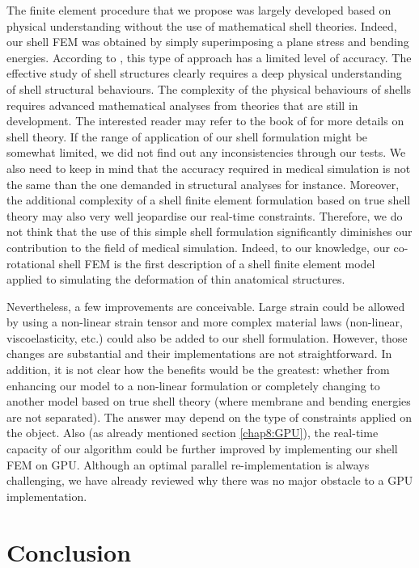 The finite element procedure that we propose was largely developed based on physical understanding without the use of mathematical shell theories. Indeed, our shell FEM was obtained by simply superimposing a plane stress and bending energies. According to \cite{Chapelle03}, this type of approach has a limited level of accuracy. The effective study of shell structures clearly requires a deep physical understanding of shell structural behaviours. The complexity of the physical behaviours of shells requires advanced mathematical analyses from theories that are still in development. The interested reader may refer to the book of \cite{Chapelle03} for more details on shell theory. If the range of application of our shell formulation might be somewhat limited, we did not find out any inconsistencies through our tests. We also need to keep in mind that the accuracy required in medical simulation is not the same than the one demanded in structural analyses for instance. Moreover, the additional complexity of a shell finite element formulation based on true shell theory may also very well jeopardise our real-time constraints. Therefore, we do not think that the use of this simple shell formulation significantly diminishes our contribution to the field of medical simulation. Indeed, to our knowledge, our co-rotational shell FEM is the first description of a shell finite element model applied to simulating the deformation of thin anatomical structures. 

Nevertheless, a few improvements are conceivable. Large strain could be allowed by using a non-linear strain tensor and more complex material laws (non-linear, viscoelasticity, etc.) could also be added to our shell formulation. However, those changes are substantial and their implementations are not straightforward. In addition, it is not clear how the benefits would be the greatest: whether from enhancing our model to a non-linear formulation or completely changing to another model based on true shell theory (where membrane and bending energies are not separated). The answer may depend on the type of constraints applied on the object. Also (as already mentioned section \ref{chap8:GPU}), the real-time capacity of our algorithm could be further improved by implementing our shell FEM on GPU. Although an optimal parallel re-implementation is always challenging, we have already reviewed why there was no major obstacle to a GPU implementation. 

\section{Conclusion}

